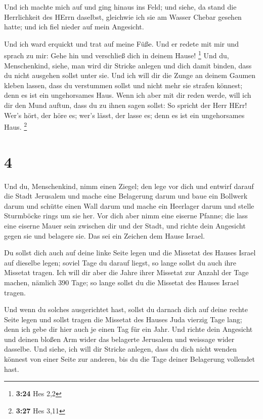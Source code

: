  Und ich machte mich auf und ging hinaus ins Feld; und
siehe, da stand die Herrlichkeit des HErrn daselbst, gleichwie ich sie
am Wasser Chebar gesehen hatte; und ich fiel nieder auf mein Angesicht.

 Und ich ward erquickt und trat auf meine Füße. Und er
redete mit mir und sprach zu mir: Gehe hin und verschließ dich in deinem
Hause! \footnote{\textbf{3:24} Hes 2,2}  Und du,
Menschenkind, siehe, man wird dir Stricke anlegen und dich damit binden,
dass du nicht ausgehen sollst unter sie.  Und ich will dir
die Zunge an deinem Gaumen kleben lassen, dass du verstummen sollst und
nicht mehr sie strafen könnest; denn es ist ein ungehorsames Haus.
 Wenn ich aber mit dir reden werde, will ich dir den Mund
auftun, dass du zu ihnen sagen sollst: So spricht der Herr HErr! Wer's
hört, der höre es; wer's lässt, der lasse es; denn es ist ein
ungehorsames Haus. \footnote{\textbf{3:27} Hes 3,11}

\hypertarget{section-1}{%
\section{4}\label{section-1}}

 Und du, Menschenkind, nimm einen Ziegel; den lege vor dich
und entwirf darauf die Stadt Jerusalem  und mache eine
Belagerung darum und baue ein Bollwerk darum und schütte einen Wall
darum und mache ein Heerlager darum und stelle Sturmböcke rings um sie
her.  Vor dich aber nimm eine eiserne Pfanne; die lass eine
eiserne Mauer sein zwischen dir und der Stadt, und richte dein Angesicht
gegen sie und belagere sie. Das sei ein Zeichen dem Hause Israel.

 Du sollst dich auch auf deine linke Seite legen und die
Missetat des Hauses Israel auf dieselbe legen; soviel Tage du darauf
liegst, so lange sollst du auch ihre Missetat tragen.  Ich
will dir aber die Jahre ihrer Missetat zur Anzahl der Tage machen,
nämlich 390 Tage; so lange sollst du die Missetat des Hauses Israel
tragen.

 Und wenn du solches ausgerichtet hast, sollst du darnach
dich auf deine rechte Seite legen und sollst tragen die Missetat des
Hauses Juda vierzig Tage lang; denn ich gebe dir hier auch je einen Tag
für ein Jahr.  Und richte dein Angesicht und deinen bloßen
Arm wider das belagerte Jerusalem und weissage wider dasselbe.
 Und siehe, ich will dir Stricke anlegen, dass du dich nicht
wenden könnest von einer Seite zur anderen, bis du die Tage deiner
Belagerung vollendet hast.

